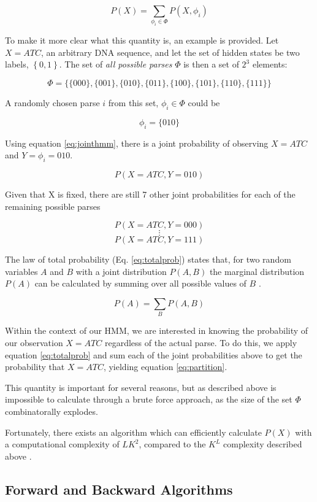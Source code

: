 \begin{equation}
 P(X) = \sum_{\phi_i \in \Phi}{P(X,\phi_i)}  
\label{eq:partition}
\end{equation}

To make it more clear what this quantity is, an example is provided. Let $X = ATC$, an arbitrary DNA sequence, and let the set of hidden states be two labels, $\left\{0,1\right\}$. The set of \emph{all possible parses} $\Phi$ is then a set of $2^3$ elements:

$$\Phi = \{\{000\},\{001\},\{010\},\{011\},\{100\},\{101\},\{110\},\{111\}\}$$

A randomly chosen parse $i$ from this set, $\phi_i \in \Phi$ could be

$$\phi_i = \{010\}$$

Using equation \ref{eq:jointhmm}, there is a joint probability of observing $X=ATC$ and $Y = \phi_i = 010$.

$$P(X=ATC,Y=010)$$

Given that X is fixed, there are still 7 other joint probabilities for each of the remaining possible parses

$$P(X=ATC,Y=000)$$
$$\vdots$$
$$P(X=ATC,Y=111)$$

The law of total probability (Eq. \ref{eq:totalprob}) states that, for two random variables $A$ and $B$ with a joint distribution $P(A,B)$ the marginal distribution $P(A)$ can be calculated by summing over all possible values of $B$ \cite{Brookes1951FoundationsProbability}.

\begin{equation}
    P(A) = \sum_B{P(A,B)}
\label{eq:totalprob}
\end{equation}

Within the context of our HMM, we are interested in knowing the probability of our observation $X=ATC$ regardless of the actual parse. To do this, we apply equation \ref{eq:totalprob} and sum each of the joint probabilities above to get the probability that $X=ATC$, yielding equation \ref{eq:partition}.

This quantity is important for several reasons, but as described above is impossible to calculate through a brute force approach, as the size of the set $\Phi$ combinatorally explodes.

Fortunately, there exists an algorithm which can efficiently calculate $P(X)$ with a computational complexity of $LK^2$, compared to the $K^L$ complexity described above \cite{Rabiner1989ARecognition}.
\subsection{Forward and Backward Algorithms}
